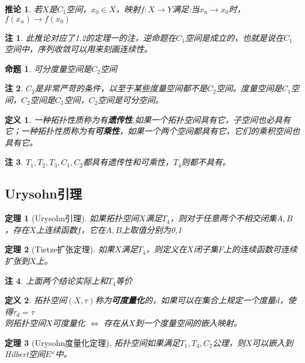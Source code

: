 \documentclass[UTF8]{ctexart}
\newtheorem{dfnt}{定义}
\newtheorem{thr}{定理}
\newtheorem*{coro}{推论}
\newtheorem*{note}{注}
\newtheorem{pro}{命题}
\begin{document}
\begin{coro}
若$X$是$C_1$空间，$x_0 \in X$，映射$f:X\rightarrow Y$满足:当$x_n \rightarrow x_0$时，$f(x_n) \rightarrow f(x_0)$
\end{coro}
\begin{note}
此推论对应了1.2的定理一的注，逆命题在$C_1$空间是成立的，也就是说在$C_1$空间中，序列收敛可以用来刻画连续性。
\end{note}
\begin{pro}
可分度量空间是$C_2$空间
\end{pro}
\begin{note}
$C_2$是非常严苛的条件，以至于某些度量空间都不是$C_2$空间。度量空间是$C_1$空间，$C_2$空间是$C_1$空间，$C_2$空间是可分空间。
\end{note}
\begin{dfnt}
一种拓扑性质称为有\textbf{遗传性},如果一个拓扑空间具有它，子空间也必具有它；一种拓扑性质称为有\textbf{可乘性}，如果一个两个空间都具有它，它们的乘积空间也具有它。
\end{dfnt}
\begin{note}
$T_1,T_2,T_3,C_1,C_2$都具有遗传性和可乘性，$T_4$则都不具有。
\end{note}
\subsection{Urysohn引理}
\begin{thr}[Urysohn引理]
如果拓扑空间$X$满足$T_4$，则对于任意两个不相交闭集$A,B$，存在$X$上连续函数$f$，它在$A,B$上取值分别为0,1
\end{thr}
\begin{thr}[Tietze扩张定理]
如果$X$满足$T_4$，则定义在$X$闭子集$F$上的连续函数可连续扩张到$X$上。
\end{thr}
\begin{note}
上面两个结论实际上和$T_4$等价
\end{note}
\begin{dfnt}
拓扑空间$(X,\tau)$称为\textbf{可度量化}的，如果可以在集合上规定一个度量$d$，使得$\tau_d = \tau$ \\
则拓扑空间$X$可度量化 $\Longleftrightarrow$ 存在从$X$到一个度量空间的嵌入映射。
\end{dfnt}
\begin{thr}[Urysohn度量化定理]
拓扑空间如果满足$T_1,T_4,C_2$公理，则$X$可以嵌入到Hilbert空间$E^{\omega}$中。
\end{thr}
\end{document}
